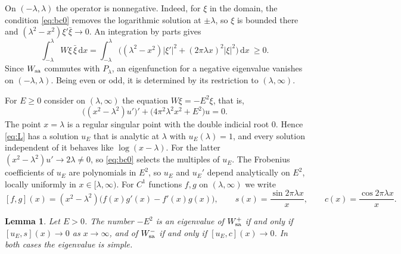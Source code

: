 \documentclass[11pt]{amsart}
\newtheorem{lemma}[theorem]{Lemma}
\theoremstyle{definition}
\newcommand{\dd}{\,\mathrm{d}}
\begin{document}
On $(-\lambda,\lambda)$ the operator is nonnegative. Indeed, for $\xi$ in the domain, the condition \eqref{eq:bc0} removes the logarithmic solution at $\pm\lambda$, so $\xi$ is bounded there and $(\lambda^2-x^2)\xi'\bar\xi\to0$. An integration by parts gives
\[
\int_{-\lambda}^{\lambda}W\xi\,\bar\xi\dd x=\int_{-\lambda}^{\lambda}\Big((\lambda^2-x^2)|\xi'|^2+(2\pi\lambda x)^2|\xi|^2\Big)\dd x\ \ge0 .
\]
Since $W_{\rm sa}$ commutes with $P_\lambda$, an eigenfunction for a negative eigenvalue vanishes on $(-\lambda,\lambda)$. Being even or odd, it is determined by its restriction to $(\lambda,\infty)$.

For $E\ge0$ consider on $(\lambda,\infty)$ the equation $W\xi=-E^2\xi$, that is,
\begin{equation}\label{eq:L}
\big((x^2-\lambda^2)u'\big)'+\big(4\pi^2\lambda^2x^2+E^2\big)u=0 .
\end{equation}
The point $x=\lambda$ is a regular singular point with the double indicial root $0$. Hence \eqref{eq:L} has a solution $u_E$ that is analytic at $\lambda$ with $u_E(\lambda)=1$, and every solution independent of it behaves like $\log(x-\lambda)$. For the latter $(x^2-\lambda^2)u'\to2\lambda\ne0$, so \eqref{eq:bc0} selects the multiples of $u_E$. The Frobenius coefficients of $u_E$ are polynomials in $E^2$, so $u_E$ and $u_E'$ depend analytically on $E^2$, locally uniformly in $x\in[\lambda,\infty)$. For $C^1$ functions $f,g$ on $(\lambda,\infty)$ we write
\[
[f,g](x)=(x^2-\lambda^2)\big(f(x)g'(x)-f'(x)g(x)\big),\qquad s(x)=\frac{\sin 2\pi\lambda x}{x},\qquad c(x)=\frac{\cos2\pi\lambda x}{x}.
\]

\begin{lemma}\label{lem:reduction}
Let $E>0$. The number $-E^2$ is an eigenvalue of $W_{\rm sa}^+$ if and only if $[u_E,s](x)\to0$ as $x\to\infty$, and of $W_{\rm sa}^-$ if and only if $[u_E,c](x)\to0$. In both cases the eigenvalue is simple.
\end{lemma}
\end{document}
